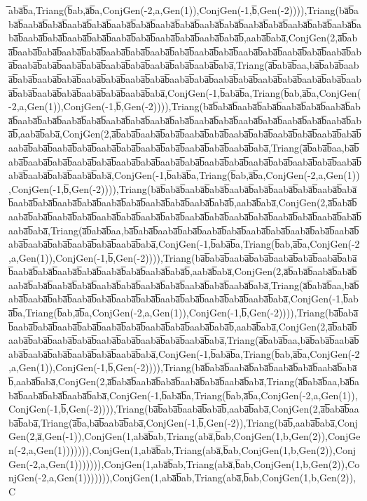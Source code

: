 ̅aba̅b̅a,Triang(b̅ab,a̅b̅a,ConjGen(-2,a,Gen(1)),ConjGen(-1,b̅,Gen(-2)))),Triang(ba̅b̅aba̅b̅aaba̅b̅aba̅b̅aaba̅b̅aba̅b̅aaba̅b̅aba̅b̅aaba̅b̅aba̅b̅aaba̅b̅aba̅b̅aaba̅b̅aba̅b̅aaba̅b̅aba̅b̅aaba̅b̅aba̅b̅aaba̅b̅aba̅b̅aaba̅b̅aba̅b̅aaba̅b̅aba̅b̅aaba̅b̅aba̅b̅aaba̅b̅aba̅b̅,aaba̅b̅aba̅,ConjGen(2,a̅b̅aba̅b̅aaba̅b̅aba̅b̅aaba̅b̅aba̅b̅aaba̅b̅aba̅b̅aaba̅b̅aba̅b̅aaba̅b̅aba̅b̅aaba̅b̅aba̅b̅aaba̅b̅aba̅b̅aaba̅b̅aba̅b̅aaba̅b̅aba̅b̅aaba̅b̅aba̅b̅aaba̅b̅aba̅b̅aaba̅b̅aba̅b̅aaba̅b̅aba̅,Triang(a̅b̅aba̅b̅aa,ba̅b̅aba̅b̅aaba̅b̅aba̅b̅aaba̅b̅aba̅b̅aaba̅b̅aba̅b̅aaba̅b̅aba̅b̅aaba̅b̅aba̅b̅aaba̅b̅aba̅b̅aaba̅b̅aba̅b̅aaba̅b̅aba̅b̅aaba̅b̅aba̅b̅aaba̅b̅aba̅b̅aaba̅b̅aba̅b̅aaba̅b̅aba̅,ConjGen(-1,b̅aba̅b̅a,Triang(b̅ab,a̅b̅a,ConjGen(-2,a,Gen(1)),ConjGen(-1,b̅,Gen(-2)))),Triang(ba̅b̅aba̅b̅aaba̅b̅aba̅b̅aaba̅b̅aba̅b̅aaba̅b̅aba̅b̅aaba̅b̅aba̅b̅aaba̅b̅aba̅b̅aaba̅b̅aba̅b̅aaba̅b̅aba̅b̅aaba̅b̅aba̅b̅aaba̅b̅aba̅b̅aaba̅b̅aba̅b̅aaba̅b̅aba̅b̅,aaba̅b̅aba̅,ConjGen(2,a̅b̅aba̅b̅aaba̅b̅aba̅b̅aaba̅b̅aba̅b̅aaba̅b̅aba̅b̅aaba̅b̅aba̅b̅aaba̅b̅aba̅b̅aaba̅b̅aba̅b̅aaba̅b̅aba̅b̅aaba̅b̅aba̅b̅aaba̅b̅aba̅b̅aaba̅b̅aba̅b̅aaba̅b̅aba̅,Triang(a̅b̅aba̅b̅aa,ba̅b̅aba̅b̅aaba̅b̅aba̅b̅aaba̅b̅aba̅b̅aaba̅b̅aba̅b̅aaba̅b̅aba̅b̅aaba̅b̅aba̅b̅aaba̅b̅aba̅b̅aaba̅b̅aba̅b̅aaba̅b̅aba̅b̅aaba̅b̅aba̅b̅aaba̅b̅aba̅,ConjGen(-1,b̅aba̅b̅a,Triang(b̅ab,a̅b̅a,ConjGen(-2,a,Gen(1)),ConjGen(-1,b̅,Gen(-2)))),Triang(ba̅b̅aba̅b̅aaba̅b̅aba̅b̅aaba̅b̅aba̅b̅aaba̅b̅aba̅b̅aaba̅b̅aba̅b̅aaba̅b̅aba̅b̅aaba̅b̅aba̅b̅aaba̅b̅aba̅b̅aaba̅b̅aba̅b̅aaba̅b̅aba̅b̅,aaba̅b̅aba̅,ConjGen(2,a̅b̅aba̅b̅aaba̅b̅aba̅b̅aaba̅b̅aba̅b̅aaba̅b̅aba̅b̅aaba̅b̅aba̅b̅aaba̅b̅aba̅b̅aaba̅b̅aba̅b̅aaba̅b̅aba̅b̅aaba̅b̅aba̅b̅aaba̅b̅aba̅,Triang(a̅b̅aba̅b̅aa,ba̅b̅aba̅b̅aaba̅b̅aba̅b̅aaba̅b̅aba̅b̅aaba̅b̅aba̅b̅aaba̅b̅aba̅b̅aaba̅b̅aba̅b̅aaba̅b̅aba̅b̅aaba̅b̅aba̅b̅aaba̅b̅aba̅,ConjGen(-1,b̅aba̅b̅a,Triang(b̅ab,a̅b̅a,ConjGen(-2,a,Gen(1)),ConjGen(-1,b̅,Gen(-2)))),Triang(ba̅b̅aba̅b̅aaba̅b̅aba̅b̅aaba̅b̅aba̅b̅aaba̅b̅aba̅b̅aaba̅b̅aba̅b̅aaba̅b̅aba̅b̅aaba̅b̅aba̅b̅aaba̅b̅aba̅b̅,aaba̅b̅aba̅,ConjGen(2,a̅b̅aba̅b̅aaba̅b̅aba̅b̅aaba̅b̅aba̅b̅aaba̅b̅aba̅b̅aaba̅b̅aba̅b̅aaba̅b̅aba̅b̅aaba̅b̅aba̅b̅aaba̅b̅aba̅,Triang(a̅b̅aba̅b̅aa,ba̅b̅aba̅b̅aaba̅b̅aba̅b̅aaba̅b̅aba̅b̅aaba̅b̅aba̅b̅aaba̅b̅aba̅b̅aaba̅b̅aba̅b̅aaba̅b̅aba̅,ConjGen(-1,b̅aba̅b̅a,Triang(b̅ab,a̅b̅a,ConjGen(-2,a,Gen(1)),ConjGen(-1,b̅,Gen(-2)))),Triang(ba̅b̅aba̅b̅aaba̅b̅aba̅b̅aaba̅b̅aba̅b̅aaba̅b̅aba̅b̅aaba̅b̅aba̅b̅aaba̅b̅aba̅b̅,aaba̅b̅aba̅,ConjGen(2,a̅b̅aba̅b̅aaba̅b̅aba̅b̅aaba̅b̅aba̅b̅aaba̅b̅aba̅b̅aaba̅b̅aba̅b̅aaba̅b̅aba̅,Triang(a̅b̅aba̅b̅aa,ba̅b̅aba̅b̅aaba̅b̅aba̅b̅aaba̅b̅aba̅b̅aaba̅b̅aba̅b̅aaba̅b̅aba̅,ConjGen(-1,b̅aba̅b̅a,Triang(b̅ab,a̅b̅a,ConjGen(-2,a,Gen(1)),ConjGen(-1,b̅,Gen(-2)))),Triang(ba̅b̅aba̅b̅aaba̅b̅aba̅b̅aaba̅b̅aba̅b̅aaba̅b̅aba̅b̅,aaba̅b̅aba̅,ConjGen(2,a̅b̅aba̅b̅aaba̅b̅aba̅b̅aaba̅b̅aba̅b̅aaba̅b̅aba̅,Triang(a̅b̅aba̅b̅aa,ba̅b̅aba̅b̅aaba̅b̅aba̅b̅aaba̅b̅aba̅,ConjGen(-1,b̅aba̅b̅a,Triang(b̅ab,a̅b̅a,ConjGen(-2,a,Gen(1)),ConjGen(-1,b̅,Gen(-2)))),Triang(ba̅b̅aba̅b̅aaba̅b̅aba̅b̅,aaba̅b̅aba̅,ConjGen(2,a̅b̅aba̅b̅aaba̅b̅aba̅,Triang(a̅b̅a,ba̅b̅aaba̅b̅aba̅,ConjGen(-1,b̅,Gen(-2)),Triang(ba̅b̅,aaba̅b̅aba̅,ConjGen(2,a̅,Gen(-1)),ConjGen(1,aba̅b̅ab,Triang(aba̅,b̅ab,ConjGen(1,b,Gen(2)),ConjGen(-2,a,Gen(1))))))),ConjGen(1,aba̅b̅ab,Triang(aba̅,b̅ab,ConjGen(1,b,Gen(2)),ConjGen(-2,a,Gen(1))))))),ConjGen(1,aba̅b̅ab,Triang(aba̅,b̅ab,ConjGen(1,b,Gen(2)),ConjGen(-2,a,Gen(1))))))),ConjGen(1,aba̅b̅ab,Triang(aba̅,b̅ab,ConjGen(1,b,Gen(2)),C